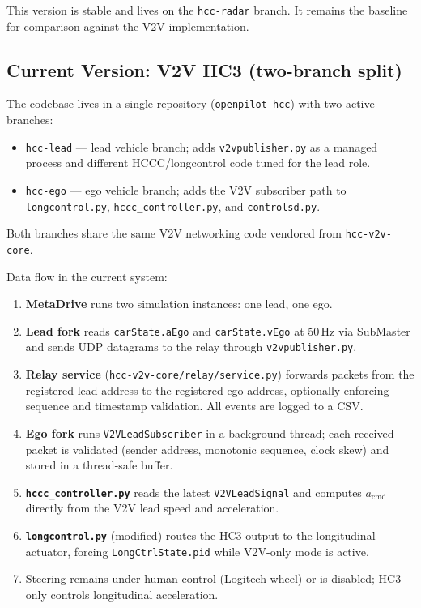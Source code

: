 \documentclass[12pt]{article}
\begin{document}
This version is stable and lives on the \texttt{hcc-radar} branch. It remains the baseline for comparison against the V2V implementation.

\subsection{Current Version: V2V HC3 (two-branch split)}

The codebase lives in a single repository (\texttt{openpilot-hcc}) with two active branches:

\begin{itemize}
  \item \texttt{hcc-lead} --- lead vehicle branch; adds \texttt{v2vpublisher.py} as a managed process and different HCCC/longcontrol code tuned for the lead role.
  \item \texttt{hcc-ego} --- ego vehicle branch; adds the V2V subscriber path to \texttt{longcontrol.py}, \texttt{hccc\_controller.py}, and \texttt{controlsd.py}.
\end{itemize}

Both branches share the same V2V networking code vendored from \texttt{hcc-v2v-core}.

Data flow in the current system:

\begin{enumerate}
  \item \textbf{MetaDrive} runs two simulation instances: one lead, one ego.
  \item \textbf{Lead fork} reads \texttt{carState.aEgo} and \texttt{carState.vEgo} at 50\,Hz via SubMaster and sends UDP datagrams to the relay through \texttt{v2vpublisher.py}.
  \item \textbf{Relay service} (\texttt{hcc-v2v-core/relay/service.py}) forwards packets from the registered lead address to the registered ego address, optionally enforcing sequence and timestamp validation. All events are logged to a CSV.
  \item \textbf{Ego fork} runs \texttt{V2VLeadSubscriber} in a background thread; each received packet is validated (sender address, monotonic sequence, clock skew) and stored in a thread-safe buffer.
  \item \textbf{\texttt{hccc\_controller.py}} reads the latest \texttt{V2VLeadSignal} and computes $a_{\text{cmd}}$ directly from the V2V lead speed and acceleration.
  \item \textbf{\texttt{longcontrol.py}} (modified) routes the HC3 output to the longitudinal actuator, forcing \texttt{LongCtrlState.pid} while V2V-only mode is active.
  \item Steering remains under human control (Logitech wheel) or is disabled; HC3 only controls longitudinal acceleration.
\end{enumerate}
\end{document}
